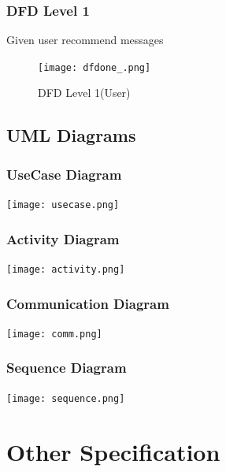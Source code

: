 \documentclass[oneside,a4paper,12pt, times]{book}
\begin{document}
\subsection{DFD Level 1}
\vskip 1cm
Given user recommend messages
\begin{figure}[h]
    \centering
\texttt{[image: dfdone\_.png]}    \caption{DFD Level 1(User)}
    \label{fig:my_label}
\end{figure}
   
 
 \section{UML Diagrams}
 \subsection{UseCase Diagram}
\begin{center}
    \centering
\texttt{[image: usecase.png]}
    \label{fig:my_label}
\end{center}
  
 \subsection{Activity Diagram}
 \begin{center}
     \centering
\texttt{[image: activity.png]}
     \label{fig:my_label}
 \end{center}
  
\subsection{Communication Diagram}
\begin{center}
    \centering
    \texttt{[image: comm.png]}
    \label{fig:my_label}
\end{center}
   
\subsection{Sequence Diagram}
\begin{center}
    \centering
    \texttt{[image: sequence.png]}
    \label{fig:my_label}
\end{center}
      



\chapter{Other Specification}
\end{document}
